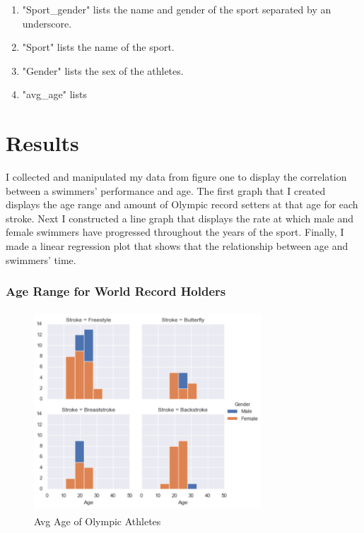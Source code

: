 \documentclass[letterpaper, 10 pt, conference]{ieeeconf}  %
\begin{document}

 \begin{enumerate}
    \item "Sport\_gender" lists the name and gender of the sport separated by an underscore.
    \item "Sport" lists the name of the sport.
    \item "Gender" lists the sex of the athletes.
    \item "avg\_age" lists
\end{enumerate}

\section{Results}
I collected and manipulated my data from figure one to display the correlation between a swimmers' performance and age. The first graph that I created displays the age range and amount of Olympic record setters at that age for each stroke. Next I constructed a line graph that displays the rate at which male and female swimmers have progressed throughout the years of the sport. Finally, I made a linear regression plot that shows that the relationship between age and swimmers' time. 

\subsubsection{Age Range for World Record Holders}
\begin{figure}
    \centering
    \includegraphics[width=8.5cm, height=7.5cm]{AverageAge}
    \caption{Avg Age of Olympic Athletes}
    \label{Fig 3}
\end{figure}
\end{document}
